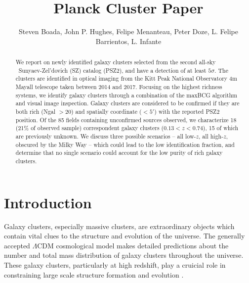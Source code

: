 \documentclass[apj, revtex4-1]{emulateapj}
\begin{document}
\title{Planck Cluster Paper}

\author{\sc Steven Boada,
John P. Hughes,
Felipe Menanteau,
Peter Doze,
L. Felipe Barrientos,
L. Infante
}



\begin{abstract}
\noindent We report on newly identified galaxy clusters selected from the second all-sky \planck\ Sunyaev-Zel'dovich (SZ) catalog (PSZ2), and have a detection of at least $5\sigma$. The clusters are identified in optical imaging from the Kitt Peak National Observatory 4m Mayall telescope taken between 2014 and 2017. Focusing on the highest richness systems, we identify galaxy clusters through a combination of the maxBCG algorithm and visual image inspection. Galaxy clusters are considered to be confirmed if they are both rich (Ngal $>20$) and spatially coordinate ($<5'$) with the reported PSZ2 position. Of the 85 fields containing unconfirmed sources observed, we characterize 18 (21\% of observed sample) correspondent galaxy clusters ($ 0.13 < z < 0.74$), 15 of which are previously unknown. We discuss three possible scenarios -- all low-$z$, all high-$z$, obscured by the Milky Way -- which could lead to the low identification fraction, and determine that no single scenario could account for the low purity of rich galaxy clusters.
\end{abstract}

\section{Introduction}
Galaxy clusters, especially massive clusters, are extraordinary objects which contain vital clues to the structure and evolution of the universe. The generally accepted $\Lambda$CDM cosmological model makes detailed predictions about the number and total mass distribution of galaxy clusters throughout the universe. These galaxy clusters, particularly at high redshift, play a cruicial role in constraining large scale structure formation and evolution .
\end{document}
